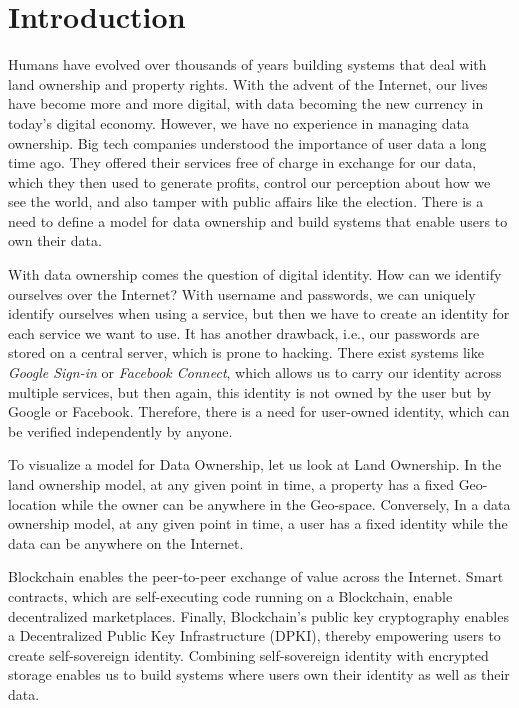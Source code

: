 \chapter{Introduction}\label{chapter::introduction}
Humans have evolved over thousands of years building systems that deal with land ownership and property rights. With the advent of the Internet, our lives have become more and more digital, with data becoming the new currency in today's digital economy. However, we have no experience in managing data ownership. Big tech companies understood the importance of user data a long time ago. They offered their services free of charge in exchange for our data, which they then used to generate profits, control our perception about how we see the world, and also tamper with public affairs like the election. There is a need to define a model for data ownership and build systems that enable users to own their data.

With data ownership comes the question of digital identity. How can we identify ourselves over the Internet? With username and passwords, we can uniquely identify ourselves when using a service, but then we have to create an identity for each service we want to use. It has another drawback, i.e., our passwords are stored on a central server, which is prone to hacking. There exist systems like \textit{Google Sign-in} or \textit{Facebook Connect}, which allows us to carry our identity across multiple services, but then again, this identity is not owned by the user but by Google or Facebook. Therefore, there is a need for user-owned identity, which can be verified independently by anyone.

To visualize a model for Data Ownership, let us look at Land Ownership. In the land ownership model, at any given point in time, a property has a fixed Geo-location while the owner can be anywhere in the Geo-space. Conversely, In a data ownership model, at any given point in time, a user has a fixed identity while the data can be anywhere on the Internet.

Blockchain enables the peer-to-peer exchange of value across the Internet. Smart contracts, which are self-executing code running on a Blockchain, enable decentralized marketplaces. Finally, Blockchain's public key cryptography enables a Decentralized Public Key Infrastructure (DPKI), thereby empowering users to create self-sovereign identity. Combining self-sovereign identity with encrypted storage enables us to build systems where users own their identity as well as their data.

